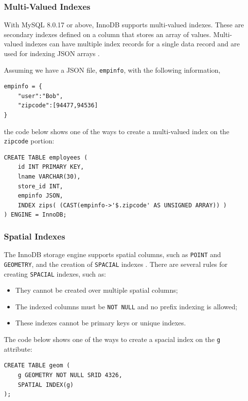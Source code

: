\documentclass[12pt]{article}
\begin{document}
\subsubsection{Multi-Valued Indexes}
\label{multiValuedIndexes}
With MySQL 8.0.17 or above, InnoDB supports multi-valued indexes. These are secondary indexes defined on a column that stores an array of values. Multi-valued indexes can have multiple index records for a single data record and are used for indexing JSON arrays \parencite{MultiValuedIndexes}. 

\vspace{0.3cm}

\noindent Assuming we have a JSON file, \verb|empinfo|, with the following information,
\begin{verbatim}
empinfo = {
    "user":"Bob",
    "zipcode":[94477,94536]
}
\end{verbatim}

\noindent the code below shows one of the ways to create a multi-valued index on the \verb|zipcode| portion:
\begin{verbatim}
CREATE TABLE employees (
    id INT PRIMARY KEY,
    lname VARCHAR(30),
    store_id INT,
    empinfo JSON,
    INDEX zips( (CAST(empinfo->'$.zipcode' AS UNSIGNED ARRAY)) )
) ENGINE = InnoDB;
\end{verbatim}


\subsubsection{Spatial Indexes}
\label{spatialIndexes}
The InnoDB storage engine supports spatial columns, such as \verb|POINT| and \verb|GEOMETRY|, and the creation of \verb|SPACIAL| indexes \parencite{SpatialIndexes}. There are several rules for creating \verb|SPACIAL| indexes, such as:
\begin{itemize}
    \item They cannot be created over multiple spatial columns;
    
    \item The indexed columns must be \verb|NOT NULL| and no prefix indexing is allowed;
    
    \item These indexes cannot be primary keys or unique indexes.

\end{itemize}

\vspace{0.3cm}

\noindent The code below shows one of the ways to create a spacial index on the \verb|g| attribute:
\begin{verbatim}
CREATE TABLE geom (
    g GEOMETRY NOT NULL SRID 4326,
    SPATIAL INDEX(g)
);
\end{verbatim}
\end{document}
